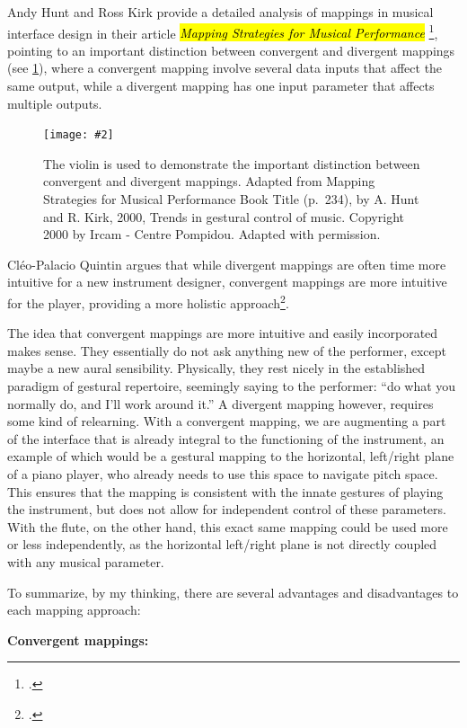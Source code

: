 \documentclass[12pt,twoside,maitrise]{dms_ks}
\newcommand{\customincludegraphics}[4][]{%
    \begin{figure}[H]
        \centering
        \texttt{[image: \#2]}
        \caption{#4}
	\label{#3} 
    \end{figure}
}
\theoremstyle{definition}
\begin{document}
{Andy Hunt and Ross Kirk provide a detailed analysis of mappings in musical interface design in their article \hl{\textit{Mapping Strategies for Musical Performance}} \footcite{hunt_mapping_2000}, pointing to an important distinction between convergent and divergent mappings (see \cref{fig:mapping}), where a convergent mapping involve several data inputs that affect the same output, while a divergent mapping has one input parameter that affects multiple outputs. 


\customincludegraphics[scale=1]{mapping.png}{fig:mapping}{The violin is used to demonstrate the important distinction between convergent and divergent mappings. Adapted from Mapping Strategies for Musical Performance Book Title (p.~234), by A. Hunt and R. Kirk, 2000, Trends in gestural control of music. Copyright 2000 by Ircam - Centre Pompidou. Adapted with permission.}

Cléo-Palacio Quintin argues that while divergent mappings are often time more intuitive for a new instrument designer, convergent mappings are more intuitive for the player, providing a more holistic approach\footcite[44--45]{palacio-quintin_composition_2012-1}. 

The idea that convergent mappings are more intuitive and easily incorporated makes sense. 
They essentially do not ask anything new of the performer, except maybe a new aural sensibility. 
Physically, they rest nicely in the established paradigm of gestural repertoire, seemingly saying to the performer: “do what you normally do, and I'll work around it.” 
A divergent mapping however, requires some kind of relearning. 
With a convergent mapping, we are augmenting a part of the interface that is already integral to the functioning of the instrument, an example of which would be a gestural mapping to the horizontal, left/right plane of a piano player, who already needs to use this space to navigate pitch space.
This ensures that the mapping is consistent with the innate gestures of playing the instrument, but does not allow for independent control of these parameters.
With the flute, on the other hand, this exact same mapping could be used more or less independently, as the horizontal left/right plane is not directly coupled with any musical parameter.

To summarize, by my thinking, there are several advantages and disadvantages to each mapping approach:

\textbf{Convergent mappings:}

}
\end{document}
